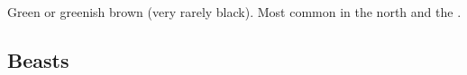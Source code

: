 \begin{gloss}
\begin{subgloss}
  \begin{comment}
  \subparagraph{\Loi}
  \end{comment}
  \gitem[\Lois]{\Loi}
    Green or greenish brown (very rarely black).
    Most common in the north and the {\Serplands}. 
\end{subgloss}








 
\end{gloss}









\subsection{Beasts}
